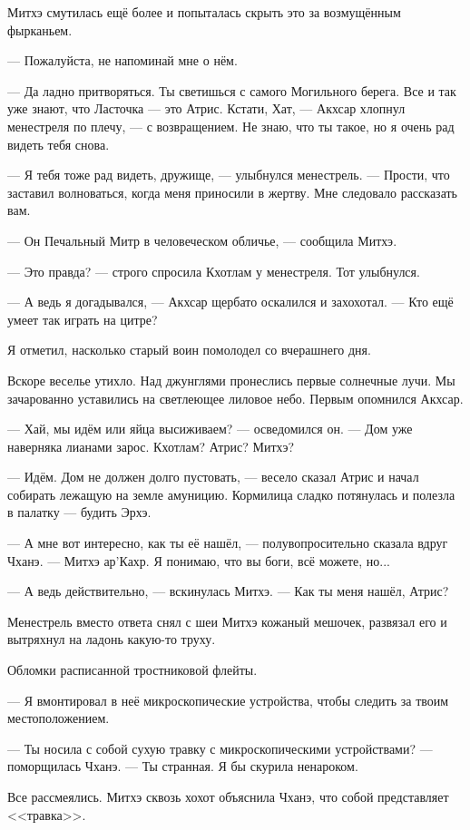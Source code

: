 Митхэ смутилась ещё более и попыталась скрыть это за возмущённым фырканьем.

--- Пожалуйста, не напоминай мне о нём.

--- Да ладно притворяться.
Ты светишься с самого Могильного берега.
Все и так уже знают, что Ласточка --- это Атрис.
Кстати, Хат, --- Акхсар хлопнул менестреля по плечу, --- с возвращением.
Не знаю, что ты такое, но я очень рад видеть тебя снова.

--- Я тебя тоже рад видеть, дружище, --- улыбнулся менестрель.
--- Прости, что заставил волноваться, когда меня приносили в жертву.
Мне следовало рассказать вам.

--- Он Печальный Митр в человеческом обличье, --- сообщила Митхэ.

--- Это правда? --- строго спросила Кхотлам у менестреля.
Тот улыбнулся.

--- А ведь я догадывался, --- Акхсар щербато оскалился и захохотал.
--- Кто ещё умеет так играть на цитре?

Я отметил, насколько старый воин помолодел со вчерашнего дня.

Вскоре веселье утихло.
Над джунглями пронеслись первые солнечные лучи.
Мы зачарованно уставились на светлеющее лиловое небо.
Первым опомнился Акхсар.

--- Хай, мы идём или яйца высиживаем? --- осведомился он.
--- Дом уже наверняка лианами зарос.
Кхотлам?
Атрис?
Митхэ?

--- Идём.
Дом не должен долго пустовать, --- весело сказал Атрис и начал собирать лежащую на земле амуницию.
Кормилица сладко потянулась и полезла в палатку --- будить Эрхэ.

--- А мне вот интересно, как ты её нашёл, --- полувопросительно сказала вдруг Чханэ.
--- Митхэ ар’Кахр.
Я понимаю, что вы боги, всё можете, но...

--- А ведь действительно, --- вскинулась Митхэ.
--- Как ты меня нашёл, Атрис?

Менестрель вместо ответа снял с шеи Митхэ кожаный мешочек, развязал его и вытряхнул на ладонь какую-то труху.

Обломки расписанной тростниковой флейты.

--- Я вмонтировал в неё микроскопические устройства, чтобы следить за твоим местоположением.

--- Ты носила с собой сухую травку с микроскопическими устройствами? --- поморщилась Чханэ.
--- Ты странная.
Я бы скурила ненароком.

Все рассмеялись.
Митхэ сквозь хохот объяснила Чханэ, что собой представляет <<травка>>.

